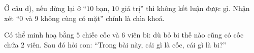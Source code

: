 {\begin{warnbox}Ở câu d), nếu dừng lại ở ``$10$ bạn, $10$ giá trị'' thì không kết luận được gì. Nhận xét ``$0$ và $9$ không cùng có
mặt'' chính là chìa khoá.\end{warnbox}
\begin{parentbox}Có thể minh hoạ bằng $5$ chiếc cốc và $6$ viên bi: dù bỏ bi thế nào cũng có cốc chứa $2$ viên. Sau đó hỏi con: ``Trong
bài này, cái gì là cốc, cái gì là bi?''\end{parentbox}
}
